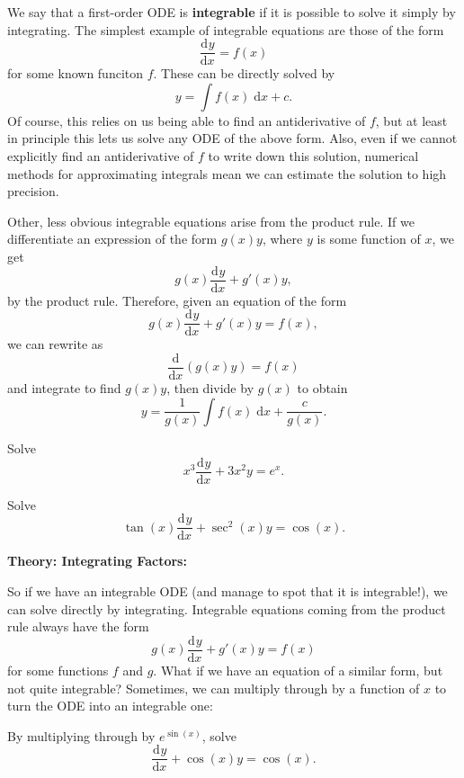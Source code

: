 \documentclass{article}
\newcommand{\deriv}[3][]{\frac{\mathrm{d}^{#1}#2}{\mathrm{d}#3^{#1}}}
\newcommand{\diff}{\;\mathrm{d}}
\begin{document}
\bigskip

We say that a first-order ODE is \textbf{integrable} if it is possible to solve it simply by integrating. The simplest example of integrable equations are those of the form
\[\deriv{y}{x}=f(x)\]
for some known funciton $f$. These can be directly solved by
\[y=\int f(x)\diff x + c.\]
Of course, this relies on us being able to find an antiderivative of $f$, but at least in principle this lets us solve any ODE of the above form. Also, even if we cannot explicitly find an antiderivative of $f$ to write down this solution, numerical methods for approximating integrals mean we can estimate the solution to high precision.

Other, less obvious integrable equations arise from the product rule. If we differentiate an expression of the form $g(x)y$, where $y$ is some function of $x$, we get
\[g(x)\deriv{y}{x}+g'(x)y,\]
by the product rule. Therefore, given an equation of the form
\[g(x)\deriv{y}{x}+g'(x)y=f(x),\]
we can rewrite as
\[\deriv{}{x}\left(g(x)y\right)=f(x)\]
and integrate to find $g(x)y$, then divide by $g(x)$ to obtain
\[y=\frac{1}{g(x)}\int f(x)\diff x + \frac{c}{g(x)}.\]

\bigskip


Solve
\[x^3\deriv{y}{x}+3x^2y=e^x.\]

\vfill

Solve
\[\tan(x)\deriv{y}{x}+\sec^2(x)y=\cos(x).\]









\clearpage










\textbf{Theory: Integrating Factors:}

\bigskip

So if we have an integrable ODE (and manage to spot that it is integrable!), we can solve directly by integrating. Integrable equations coming from the product rule always have the form
\[g(x)\deriv{y}{x}+g'(x)y=f(x)\]
for some functions $f$ and $g$. What if we have an equation of a similar form, but not quite integrable? Sometimes, we can multiply through by a function of $x$ to turn the ODE into an integrable one:\medskip

By multiplying through by $e^{\sin(x)}$, solve
\[\deriv{y}{x}+\cos(x)y=\cos(x).\]
\end{document}
